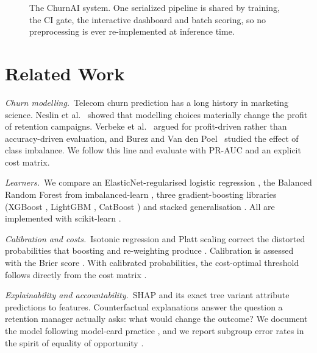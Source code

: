 \documentclass[conference]{IEEEtran}
\newcommand{\para}[1]{\par\textit{#1.}\ }%
\begin{document}
\begin{figure}[t]
\caption{The ChurnAI system. One serialized pipeline is shared by training, the CI gate,
the interactive dashboard and batch scoring, so no preprocessing is ever re-implemented at
inference time.}
\label{fig:system}
\end{figure}

\section{Related Work}
\label{sec:related}

\para{Churn modelling}Telecom churn prediction has a long history in marketing science.
Neslin et al.~\cite{neslin2006defection} showed that modelling choices materially change the profit of
retention campaigns. Verbeke et al.~\cite{verbeke2012new} argued for profit-driven rather than
accuracy-driven evaluation, and Burez and Van den Poel~\cite{burez2009handling} studied the effect of class imbalance.
We follow this line and evaluate with PR-AUC and an explicit cost matrix.

\para{Learners}We compare an ElasticNet-regularised logistic regression
\cite{zou2005regularization}, the Balanced Random Forest \cite{chen2004using} from
imbalanced-learn \cite{lemaitre2017imbalanced}, three gradient-boosting libraries
(XGBoost \cite{chen2016xgboost}, LightGBM \cite{ke2017lightgbm}, CatBoost
\cite{prokhorenkova2018catboost}) and stacked generalisation \cite{wolpert1992stacked}. All
are implemented with scikit-learn \cite{pedregosa2011scikit}.

\para{Calibration and costs}Isotonic regression \cite{zadrozny2002transforming} and Platt
scaling correct the distorted probabilities that boosting and re-weighting produce
\cite{niculescu2005predicting}. Calibration is assessed with the Brier score
\cite{brier1950verification}. With calibrated probabilities, the cost-optimal threshold follows
directly from the cost matrix \cite{elkan2001foundations}.

\para{Explainability and accountability}SHAP \cite{lundberg2017unified} and its exact tree
variant \cite{lundberg2020local} attribute predictions to features. Counterfactual explanations
\cite{wachter2018counterfactual} answer the question a retention manager actually asks: what
would change the outcome? We document the model following model-card practice
\cite{mitchell2019model}, and we report subgroup error rates in the spirit of equality of
opportunity \cite{hardt2016equality}.
\end{document}
